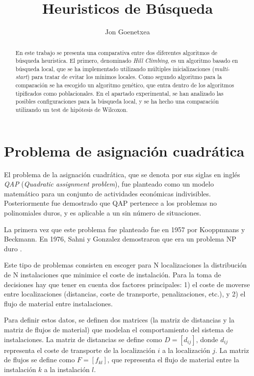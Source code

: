 \documentclass[10pt,a4paper]{article}
\author{Jon Goenetxea}
\title{Heuristicos de Búsqueda}
\begin{document}
\maketitle

\begin{abstract}
En este trabajo se presenta una comparativa entre dos diferentes algoritmos de búsqueda heuristica. El primero, denominado \textit{Hill Climbing}, es un algoritmo basado en búsqueda local, que se ha implementado utilizando múltiples inicializaciones (\textit{multi-start}) para tratar de evitar los mínimos locales. Como segundo algoritmo para la comparación se ha escogido un algoritmo genético, que entra dentro de los algoritmos tipificados como poblacionales. En el apartado experimental, se han analizado las posibles configuraciones para la búsqueda local, y se ha hecho una comparación utilizando un test de hipótesis de Wilcoxon.
\end{abstract}

\section{Problema de asignación cuadrática}
\label{sec:planteamiento}
El problema de la asignación cuadrática, que se denota por sus siglas en inglés \textit{QAP} (\textit{Quadratic assignment problem}), fue planteado como un modelo matemático para un conjunto de actividades económicas indivisibles. Posteriormente fue demostrado que QAP pertenece a los problemas no polinomiales duros, y es aplicable a un sin número de situaciones.

La primera vez que este problema fue planteado fue en 1957 por Kooppmnans y Beckmann. En 1976, Sahni y Gonzalez demostraron que era un problema NP duro \cite{Sahni:1976:PAP:321958.321975}.

Este tipo de problemas consisten en escoger para N localizaciones la distribución de N instalaciones que minimice el coste de instalación. Para la toma de decisiones hay que tener en cuenta dos factores principales: 1) el coste de moverse entre localizaciones (distancias, coste de transporte, penalizaciones, etc.), y 2) el flujo de material entre instalaciones.

Para definir estos datos, se definen dos matrices (la matriz de distancias y la matriz de flujos de material) que modelan el comportamiento del sistema de instalaciones. La matriz de distancias se define como $D=[d_{ij}]$, donde $d_{ij}$ representa el coste de transporte de la localización $i$ a la localización $j$. La matriz de flujos se define como $F=[f_{kl}]$, que representa el flujo de material entre la instalación $k$ a la instalación $l$.
\end{document}
